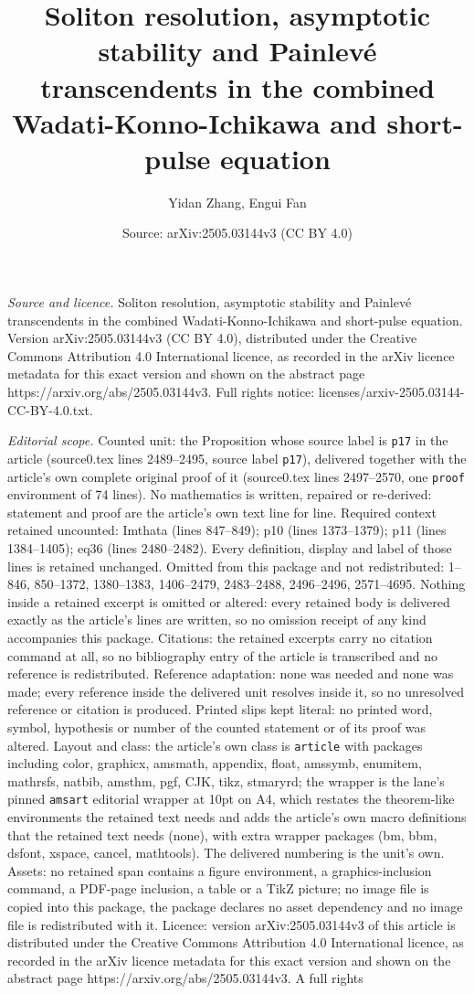 \documentclass[10pt,a4paper]{amsart}
\title[Soliton resolution, asymptotic stability and Painlev\'e tran]{Soliton resolution, asymptotic stability and Painlev\'e transcendents in the combined Wadati-Konno-Ichikawa and short-pulse equation}
\author{Yidan Zhang, Engui Fan}
\date{Source: arXiv:2505.03144v3 (CC BY 4.0)}
\begin{document}
\maketitle

\noindent\emph{Source and licence.} Soliton resolution, asymptotic stability and Painlev\'e transcendents in the combined Wadati-Konno-Ichikawa and short-pulse equation. Version arXiv:2505.03144v3 (CC BY 4.0), distributed under the Creative Commons Attribution 4.0 International licence, as recorded in the arXiv licence metadata for this exact version and shown on the abstract page https://arxiv.org/abs/2505.03144v3. Full rights notice: licenses/arxiv-2505.03144-CC-BY-4.0.txt.\par\smallskip

\noindent\textit{Editorial scope.} Counted unit: the Proposition whose source label is \texttt{p17} in the article (source0.tex lines 2489--2495, source label \texttt{p17}), delivered together with the article's own complete original proof of it (source0.tex lines 2497--2570, one \texttt{proof} environment of 74 lines). No mathematics is written, repaired or re-derived: statement and proof are the article's own text line for line. Required context retained uncounted: Imthata (lines 847--849); p10 (lines 1373--1379); p11 (lines 1384--1405); eq36 (lines 2480--2482). Every definition, display and label of those lines is retained unchanged. Omitted from this package and not redistributed: 1--846, 850--1372, 1380--1383, 1406--2479, 2483--2488, 2496--2496, 2571--4695. Nothing inside a retained excerpt is omitted or altered: every retained body is delivered exactly as the article's lines are written, so no omission receipt of any kind accompanies this package. Citations: the retained excerpts carry no citation command at all, so no bibliography entry of the article is transcribed and no reference is redistributed. Reference adaptation: none was needed and none was made; every reference inside the delivered unit resolves inside it, so no unresolved reference or citation is produced. Printed slips kept literal: no printed word, symbol, hypothesis or number of the counted statement or of its proof was altered. Layout and class: the article's own class is \texttt{article} with packages including color, graphicx, amsmath, appendix, float, amssymb, enumitem, mathrsfs, natbib, amsthm, pgf, CJK, tikz, stmaryrd; the wrapper is the lane's pinned \texttt{amsart} editorial wrapper at 10pt on A4, which restates the theorem-like environments the retained text needs and adds the article's own macro definitions that the retained text needs (none), with extra wrapper packages (bm, bbm, dsfont, xspace, cancel, mathtools). The delivered numbering is the unit's own. Assets: no retained span contains a figure environment, a graphics-inclusion command, a PDF-page inclusion, a table or a TikZ picture; no image file is copied into this package, the package declares no asset dependency and no image file is redistributed with it. Licence: version arXiv:2505.03144v3 of this article is distributed under the Creative Commons Attribution 4.0 International licence, as recorded in the arXiv licence metadata for this exact version and shown on the abstract page https://arxiv.org/abs/2505.03144v3. A full rights 
\end{document}
